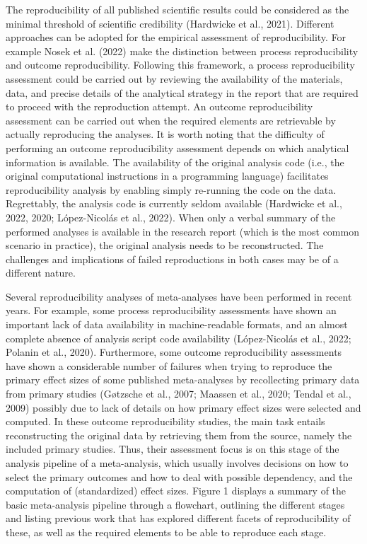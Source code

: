 \documentclass[
  ,jou, a4paper,floatsintext]{apa6}
\begin{document}
The reproducibility of all published scientific results could be considered as the minimal threshold of scientific credibility (Hardwicke et al., 2021). Different approaches can be adopted for the empirical assessment of reproducibility. For example Nosek et al. (2022) make the distinction between process reproducibility and outcome reproducibility. Following this framework, a process reproducibility assessment could be carried out by reviewing the availability of the materials, data, and precise details of the analytical strategy in the report that are required to proceed with the reproduction attempt. An outcome reproducibility assessment can be carried out when the required elements are retrievable by actually reproducing the analyses. It is worth noting that the difficulty of performing an outcome reproducibility assessment depends on which analytical information is available. The availability of the original analysis code (i.e., the original computational instructions in a programming language) facilitates reproducibility analysis by enabling simply re-running the code on the data. Regrettably, the analysis code is currently seldom available (Hardwicke et al., 2022, 2020; López-Nicolás et al., 2022). When only a verbal summary of the performed analyses is available in the research report (which is the most common scenario in practice), the original analysis needs to be reconstructed. The challenges and implications of failed reproductions in both cases may be of a different nature.

Several reproducibility analyses of meta-analyses have been performed in recent years. For example, some process reproducibility assessments have shown an important lack of data availability in machine-readable formats, and an almost complete absence of analysis script code availability (López-Nicolás et al., 2022; Polanin et al., 2020). Furthermore, some outcome reproducibility assessments have shown a considerable number of failures when trying to reproduce the primary effect sizes of some published meta-analyses by recollecting primary data from primary studies (Gøtzsche et al., 2007; Maassen et al., 2020; Tendal et al., 2009) possibly due to lack of details on how primary effect sizes were selected and computed. In these outcome reproducibility studies, the main task entails reconstructing the original data by retrieving them from the source, namely the included primary studies. Thus, their assessment focus is on this stage of the analysis pipeline of a meta-analysis, which usually involves decisions on how to select the primary outcomes and how to deal with possible dependency, and the computation of (standardized) effect sizes. Figure 1 displays a summary of the basic meta-analysis pipeline through a flowchart, outlining the different stages and listing previous work that has explored different facets of reproducibility of these, as well as the required elements to be able to reproduce each stage.
\end{document}
